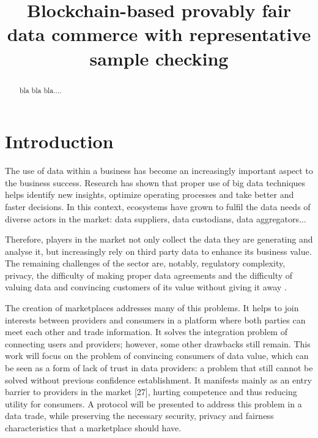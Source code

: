 \documentclass[]{article}
\title{Blockchain-based provably fair data commerce with representative sample checking}
\author{}
\begin{document}
	
	\maketitle
	
	\begin{abstract}
		bla bla bla....
	\end{abstract}
	
	\section{Introduction}
	The use of data within a business has become an increasingly important aspect to the business success. Research has shown that proper use of big data techniques helps identify new insights, optimize operating processes and take better and faster decisions. In this context, ecosystems have grown to fulfil the data needs of diverse actors in the market: data suppliers, data custodians, data aggregators... 

Therefore, players in the market not only collect the data they are generating and analyse it, but increasingly rely on third party data to enhance its business value. The remaining challenges of the sector are, notably, regulatory complexity, privacy, the difficulty of making proper data agreements and the difficulty of valuing data and convincing customers of its value without giving it away \cite{thomas16}.
	
The creation of marketplaces addresses many of this problems. It helps to join interests between providers and consumers in a platform where both parties can meet each other and trade information. It solves the integration problem of connecting users and providers; however, some other drawbacks still remain. This work will focus on the problem of convincing consumers of data value, which can be seen as a form of lack of trust in data providers: a problem that still cannot be solved without previous confidence establishment. It manifests mainly as an entry barrier to providers in the market [27], hurting competence and thus reducing utility for consumers. A protocol will be presented to address this problem in a data trade, while preserving the necessary security, privacy and fairness characteristics that a marketplace should have.

\end{document}
